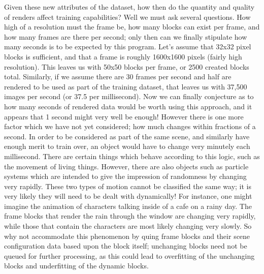 \documentclass[conference]{IEEEtran}
\begin{document}
Given these new attributes of the dataset,
how then do the quantity and quality of renders affect training capabilities?
Well we must ask several questions.
How high of a resolution must the frame be, how many blocks can exist per frame,
and how many frames are there per second;
only then can we finally stipulate how many seconds is to be expected by this program.
Let's assume that 32x32 pixel blocks is sufficient, and that a frame is roughly 1600x1600 pixels (fairly high resolution).
This leaves us with 50x50 blocks per frame, or 2500 created blocks total.
Similarly, if we assume there are 30 frames per second and half are rendered to be used as part of the training dataset,
that leaves us with 37,500 images per second (or 37.5 per millisecond).
Now we can finally conjecture as to how many seconds of rendered data would be worth using this approach,
and it appears that 1 second might very well be enough!
However there is one more factor which we have not yet considered; how much changes within fractions of a second.
In order to be considered as part of the same scene, and similarly have enough merit to train over,
an object would have to change very minutely each millisecond.
There are certain things which behave according to this logic, such as the movement of living things.
However, there are also objects such as particle systems which are intended to give the impression of randomness by changing very rapidly.
These two types of motion cannot be classified the same way;
it is very likely they will need to be dealt with dynamically!
For instance, one might imagine the animation of characters talking inside of a cafe on a rainy day.
The frame blocks that render the rain through the window are changing very rapidly,
while those that contain the characters are most likely changing very slowly.
So why not accommodate this phenomenon by quing frame blocks and their scene configuration data based upon the block itself;
unchanging blocks need not be queued for further processing,
as this could lead to overfitting of the unchanging blocks and underfitting of the dynamic blocks.
\end{document}
